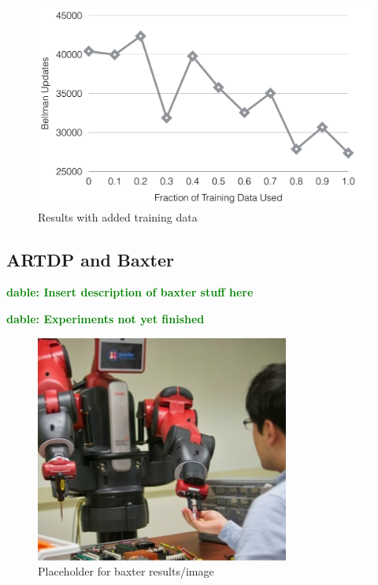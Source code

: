 \documentclass[letterpaper]{article}
\newcommand{\dnote}[1]{\textcolor{Green}{\textbf{dable:  #1}}}
\begin{document}
\begin{figure}[H]
\centering
\includegraphics[scale=0.23]{figures/training_results.png}%
  \caption{Results with added training data}
  \label{fig:training_results}
\end{figure}

\subsection{ARTDP and Baxter}

\dnote{Insert description of baxter stuff here}

\dnote{Experiments not yet finished}

\begin{figure}[H]
\centering
\includegraphics[scale=0.195]{figures/baxter_temp.jpg}%
  \caption{Placeholder for baxter results/image}
  \label{fig:baxter_results}
\end{figure}

\end{document}
